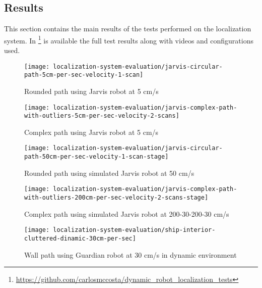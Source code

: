 \subsection{Results}

This section contains the main results of the tests performed on the localization system. In \footnote{\url{https://github.com/carlosmccosta/dynamic_robot_localization_tests}} is available the full test results along with videos and configurations used.

\begin{figure}[H]
	\centering
	\texttt{[image: localization-system-evaluation/jarvis-circular-path-5cm-per-sec-velocity-1-scan]}
	\caption{Rounded path using Jarvis robot at 5 cm/s}
	\label{fig:localization-system-evaluation_jarvis-circular-path-5cm-per-sec-velocity-1-scan}
\end{figure}

\begin{figure}[H]
	\centering
	\texttt{[image: localization-system-evaluation/jarvis-complex-path-with-outliers-5cm-per-sec-velocity-2-scans]}
	\caption{Complex path using Jarvis robot at 5 cm/s}
	\label{fig:localization-system-evaluation_jarvis-complex-path-with-outliers-5cm-per-sec-velocity-2-scans}
\end{figure}

\begin{figure}[H]
	\centering
	\texttt{[image: localization-system-evaluation/jarvis-circular-path-50cm-per-sec-velocity-1-scan-stage]}
	\caption{Rounded path using simulated Jarvis robot at 50 cm/s}
	\label{fig:localization-system-evaluation_jarvis-circular-path-50cm-per-sec-velocity-1-scan-stage}
\end{figure}

\begin{figure}[H]
	\centering
	\texttt{[image: localization-system-evaluation/jarvis-complex-path-with-outliers-200cm-per-sec-velocity-2-scans-stage]}
	\caption{Complex path using simulated Jarvis robot at 200-30-200-30 cm/s}
	\label{fig:localization-system-evaluation_jarvis-complex-path-with-outliers-200cm-per-sec-velocity-2-scans-stage}
\end{figure}

\begin{figure}[H]
	\centering
	\texttt{[image: localization-system-evaluation/ship-interior-cluttered-dinamic-30cm-per-sec]}
	\caption{Wall path using Guardian robot at 30 cm/s in dynamic environment}
	\label{fig:localization-system-evaluation_ship-interior-cluttered-dinamic-30cm-per-sec}
\end{figure}


